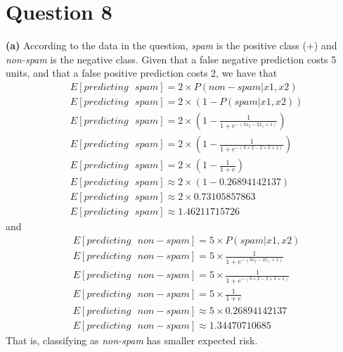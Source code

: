 \documentclass[leqno]{article}
\begin{document}
\section*{Question 8} \noindent \textbf{(a)} According to the data in the question, \textit{spam} is the positive class (+) and \textit{non-spam} is the negative class. 
Given that a false negative prediction costs 5 units, and that a false positive prediction costs 2, we have that
\begin{equation*}
\begin{split}
&E[predicting\mbox{ }spam] = 2 \times P(non-spam|x1, x2)\\
&E[predicting\mbox{ }spam] = 2 \times (1 - P(spam|x1, x2))\\
&E[predicting\mbox{ }spam] = 2 \times (1 - \frac{1}{1 + e^{-(3x_2 - 2x_1 + 1)}})\\
&E[predicting\mbox{ }spam] = 2 \times (1 - \frac{1}{1 + e^{-(3 \times 2 - 2 \times 3 + 1)}})\\
&E[predicting\mbox{ }spam] = 2 \times (1 - \frac{1}{1 + e})\\
&E[predicting\mbox{ }spam] \approx 2 \times (1 - 0.26894142137)\\
&E[predicting\mbox{ }spam] \approx 2 \times 0.73105857863\\
&E[predicting\mbox{ }spam] \approx 1.46211715726
\end{split}
\end{equation*} 
and
\begin{equation*}
\begin{split}
&E[predicting\mbox{ }non-spam] = 5 \times P(spam|x1, x2)\\
&E[predicting\mbox{ }non-spam] = 5 \times \frac{1}{1 + e^{-(3x_2 - 2x_1 + 1)}}\\
&E[predicting\mbox{ }non-spam] = 5 \times \frac{1}{1 + e^{-(3 \times 2 - 2 \times 3 + 1)}}\\
&E[predicting\mbox{ }non-spam] = 5 \times \frac{1}{1 + e}\\
&E[predicting\mbox{ }non-spam] \approx 5 \times 0.26894142137\\
&E[predicting\mbox{ }non-spam] \approx 1.34470710685
\end{split}
\end{equation*} 
That is, classifying as \textit{non-spam} has smaller expected risk.
\end{document}
